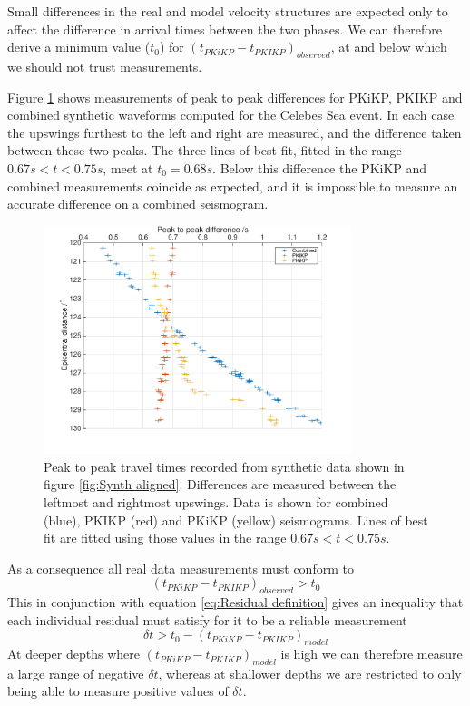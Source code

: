 \documentclass[11pt,a4paper]{article}
\begin{document}
Small differences in the real and model velocity structures are expected only to affect the difference in arrival times between the two phases. We can therefore derive a minimum value ($t_{0}$) for $ \left ( t_{PKiKP} - t_{PKIKP} \right )_{observed}$, at and below which we should not trust measurements.

Figure \ref{fig:Min distance} shows measurements of peak to peak differences for PKiKP, PKIKP and combined synthetic waveforms computed for the Celebes Sea event. In each case the upswings furthest to the left and right are measured, and the difference taken between these two peaks. The three lines of best fit, fitted in the range $0.67s < t < 0.75s$, meet at $ t_{0} = 0.68s$. Below this difference the PKiKP and combined measurements coincide as expected, and it is impossible to measure an accurate difference on a combined seismogram.

\begin{figure}
	\centering
	\includegraphics[width=0.8\textwidth]{figures/min_distance}
	\caption{Peak to peak travel times recorded from synthetic data shown in figure \ref{fig:Synth aligned}. Differences are measured between the leftmost and rightmost upswings. Data is shown for combined (blue), PKIKP (red) and PKiKP (yellow) seismograms. Lines of best fit are fitted using those values in the range $0.67s < t < 0.75s$.}
	\label{fig:Min distance}
\end{figure}

As a consequence all real data measurements must conform to
\begin{equation}
	\left ( t_{PKiKP} - t_{PKIKP} \right )_{observed} > t_{0}
\end{equation}
This in conjunction with equation \eqref{eq:Residual definition} gives an inequality that each individual residual must satisfy for it to be a reliable measurement
\begin{equation}
	\delta t > t_{0} -  \left ( t_{PKiKP} - t_{PKIKP} \right )_{model}
	\label{eq:Residual ineq}
\end{equation}
At deeper depths where $ \left ( t_{PKiKP} - t_{PKIKP} \right )_{model} $ is high we can therefore measure a large range of negative $\delta t$, whereas at shallower depths we are restricted to only being able to measure positive values of $\delta t$.
\end{document}
